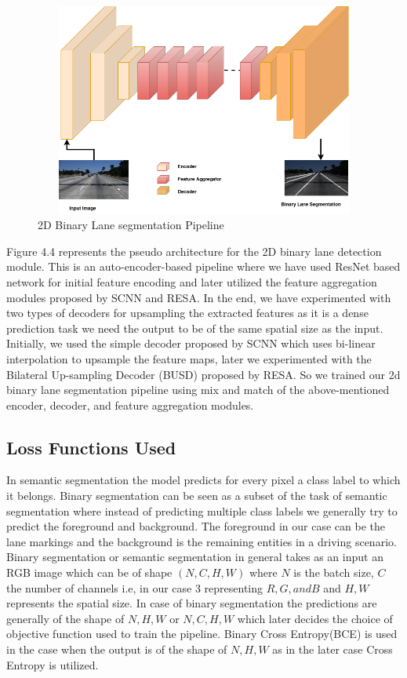            \begin{figure}[h]
    \centering
    \includegraphics[width=12cm, height=7cm]{images/2dlane_pipleline.png}
    \caption{2D Binary Lane segmentation Pipeline \cite{Tusimple}}
    \end{figure}
        
        Figure 4.4 represents the pseudo architecture for the 2D binary lane detection module. This is an auto-encoder-based pipeline where we have used ResNet \cite{DBLP:journals/corr/HeZRS15} based network for initial feature encoding and later utilized the feature aggregation modules proposed by SCNN\cite{pan2018SCNN} and RESA\cite{DBLP:journals/corr/abs-2008-13719}. In the end, we have experimented with two types of decoders for upsampling the extracted features as it is a dense prediction task we need the output to be of the same spatial size as the input. Initially, we used the simple decoder proposed by SCNN\cite{pan2018SCNN} which uses bi-linear interpolation to upsample the feature maps, later we experimented with the Bilateral Up-sampling Decoder (BUSD) proposed by RESA\cite{DBLP:journals/corr/abs-2008-13719}. So we trained our 2d binary lane segmentation pipeline using mix and match of the above-mentioned encoder, decoder, and feature aggregation modules.
        
        \subsection{Loss Functions Used}
         In semantic segmentation the model predicts for every pixel a class label to which it belongs. Binary segmentation can be seen as a subset of the task of semantic segmentation where instead of predicting multiple class labels we generally try to predict the foreground and background. The foreground in our case can be the lane markings and the background is the remaining entities in a driving scenario.
        Binary segmentation or semantic segmentation in general takes as an input an RGB image which can be of shape $(N,C,H,W)$ where $N$ is the batch size, $C$ the number of channels i.e, in our case 3 representing $R, G, and B$ and $H,W$ represents the spatial size. In case of binary segmentation the predictions are generally of the shape of $N,H,W$ or $N,C,H,W$ which later decides the choice of objective function used to train the pipeline. Binary Cross Entropy(BCE) is used in the case when the output is of the shape of $N,H,W$ as in the later case Cross Entropy is utilized.
        
